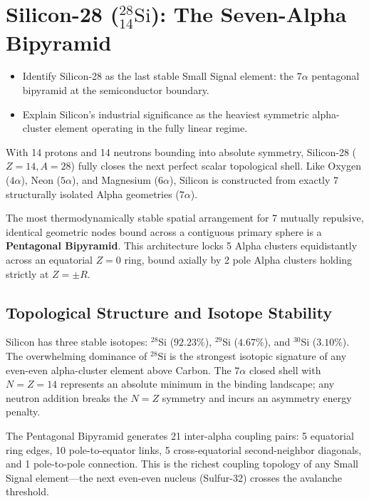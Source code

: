 \chapter{Silicon-28 ($^{28}_{14}\text{Si}$): The Seven-Alpha Bipyramid}
\label{ch:silicon}

\begin{objectivebox}
\begin{itemize}
    \item Identify Silicon-28 as the last stable Small Signal element: the $7\alpha$ pentagonal bipyramid at the semiconductor boundary.
    \item Explain Silicon's industrial significance as the heaviest symmetric alpha-cluster element operating in the fully linear regime.
\end{itemize}
\end{objectivebox}


With 14 protons and 14 neutrons bounding into absolute symmetry, Silicon-28 ($Z=14, A=28$) fully closes the next perfect scalar topological shell. Like Oxygen ($4\alpha$), Neon ($5\alpha$), and Magnesium ($6\alpha$), Silicon is constructed from exactly 7 structurally isolated Alpha geometries ($7\alpha$).

The most thermodynamically stable spatial arrangement for 7 mutually repulsive, identical geometric nodes bound across a contiguous primary sphere is a \textbf{Pentagonal Bipyramid}. This architecture locks 5 Alpha clusters equidistantly across an equatorial $Z=0$ ring, bound axially by 2 pole Alpha clusters holding strictly at $Z = \pm R$.

\section{Topological Structure and Isotope Stability}
Silicon has three stable isotopes: $^{28}$Si ($92.23\%$), $^{29}$Si ($4.67\%$), and $^{30}$Si ($3.10\%$). The overwhelming dominance of $^{28}$Si is the strongest isotopic signature of any even-even alpha-cluster element above Carbon. The $7\alpha$ closed shell with $N=Z=14$ represents an absolute minimum in the binding landscape; any neutron addition breaks the $N=Z$ symmetry and incurs an asymmetry energy penalty.

The Pentagonal Bipyramid generates 21 inter-alpha coupling pairs: 5 equatorial ring edges, 10 pole-to-equator links, 5 cross-equatorial second-neighbor diagonals, and 1 pole-to-pole connection. This is the richest coupling topology of any Small Signal element---the next even-even nucleus (Sulfur-32) crosses the avalanche threshold.

